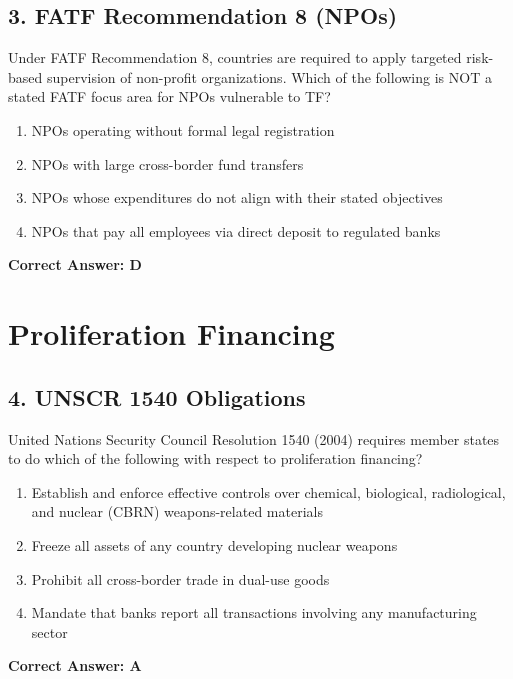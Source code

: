 \documentclass[11pt,a4paper]{article}
\begin{document}
	\subsection{3. FATF Recommendation 8 (NPOs)}
	Under FATF Recommendation 8, countries are required to apply targeted risk-based supervision of non-profit organizations. Which of the following is NOT a stated FATF focus area for NPOs vulnerable to TF?
	\begin{enumerate}[label=\Alph*.]
		\item NPOs operating without formal legal registration
		\item NPOs with large cross-border fund transfers
		\item NPOs whose expenditures do not align with their stated objectives
		\item NPOs that pay all employees via direct deposit to regulated banks
	\end{enumerate}
	\textbf{Correct Answer: D}
	
	\section{Proliferation Financing}
	
	\subsection{4. UNSCR 1540 Obligations}
	United Nations Security Council Resolution 1540 (2004) requires member states to do which of the following with respect to proliferation financing?
	\begin{enumerate}[label=\Alph*.]
		\item Establish and enforce effective controls over chemical, biological, radiological, and nuclear (CBRN) weapons-related materials
		\item Freeze all assets of any country developing nuclear weapons
		\item Prohibit all cross-border trade in dual-use goods
		\item Mandate that banks report all transactions involving any manufacturing sector
	\end{enumerate}
	\textbf{Correct Answer: A}
	
\end{document}
